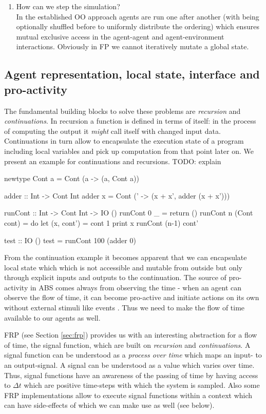 \begin{enumerate}
	\item How can we step the simulation? \\
	In the established OO approach agents are run one after another (with being optionally shuffled before to uniformly distribute the ordering) which ensures mutual exclusive access in the agent-agent and agent-environment interactions. Obviously in FP we cannot iteratively mutate a global state.
\end{enumerate}

\subsection{Agent representation, local state, interface and pro-activity}
The fundamental building blocks to solve these problems are \textit{recursion} and \textit{continuations}. In recursion a function is defined in terms of itself: in the process of computing the output it \textit{might} call itself with changed input data. Continuations in turn allow to encapsulate the execution state of a program including local variables and pick up computation from that point later on. We present an example for continuations and recursions. TODO: explain

\begin{HaskellCode}
newtype Cont a = Cont (a -> (a, Cont a))

adder :: Int -> Cont Int
adder x = Cont (\x' -> (x + x', adder (x + x')))

runCont :: Int -> Cont Int -> IO ()
runCont 0 _ = return ()
runCont n (Cont cont) = do
  let (x, cont') = cont 1
  print x
  runCont (n-1) cont'

test :: IO ()
test = runCont 100 (adder 0)
\end{HaskellCode}

From the continuation example it becomes apparent that we can encapsulate local state which which is not accessible and mutable from outside but only through explicit inputs and outputs to the continuation. The source of pro-activity in ABS comes always from observing the time - when an agent can observe the flow of time, it can become pro-active and initiate actions on its own without external stimuli like events \cite{thaler_art_2017}. Thus we need to make the flow of time available to our agents as well. 

FRP (see Section \ref{sec:frp}) provides us with an interesting abstraction for a flow of time, the signal function, which are built on \textit{recursion} and \textit{continuations}. A signal function can be understood as a \textit{process over time} which maps an input- to an output-signal. A signal can be understood as a value which varies over time. Thus, signal functions have an awareness of the passing of time by having access to $\Delta t$ which are positive time-steps with which the system is sampled. Also some FRP implementations allow to execute signal functions within a context which can have side-effects \cite{perez_functional_2016} of which we can make use as well (see below).

